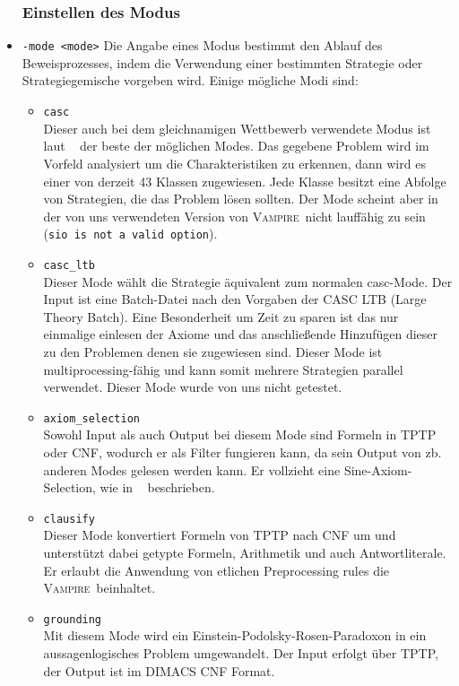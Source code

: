 \documentclass{article}
\newcommand{\vampire}{\textsc{Vampire}~}
\begin{document}
\begin{itemize}
	\subsubsection{Einstellen des Modus}

\item \verb|-mode <mode>| \label{arg:modes}
Die Angabe eines Modus bestimmt den Ablauf des Beweisprozesses, 
indem die Verwendung einer bestimmten Strategie oder Strategiegemische vorgeben wird.
Einige mögliche Modi sind:
\begin{itemize}
	\item \verb|casc| \\
	Dieser auch bei dem gleichnamigen Wettbewerb verwendete Modus ist laut ~\cite{hoder2011slides} der beste der möglichen Modes.
	Das gegebene Problem wird im Vorfeld analysiert um die Charakteristiken zu erkennen, dann wird es einer von derzeit 43 Klassen zugewiesen. Jede Klasse besitzt eine Abfolge von Strategien, die das Problem lösen sollten.
	Der Mode scheint aber in der von uns verwendeten Version von \vampire nicht lauffähig zu sein (\texttt{sio is not a valid option}).
	\item \verb|casc_ltb| \\
	Dieser Mode wählt die Strategie äquivalent zum normalen casc-Mode. Der Input ist eine Batch-Datei nach den Vorgaben der CASC LTB (Large Theory Batch). Eine Besonderheit um Zeit zu sparen ist das nur einmalige einlesen der Axiome und das anschließende Hinzufügen dieser zu den Problemen denen sie zugewiesen sind. Dieser Mode ist multiprocessing-fähig und kann somit mehrere Strategien parallel verwendet. Dieser Mode wurde von uns nicht getestet.
	\item \verb|axiom_selection| \\
	Sowohl Input als auch Output bei diesem Mode sind Formeln in TPTP oder CNF, wodurch er als Filter fungieren kann, da sein Output von zb. anderen Modes gelesen werden kann.
	Er vollzieht eine Sine-Axiom-Selection, wie in ~\cite{sinquanon} beschrieben.
	\item \verb|clausify| \\
	Dieser Mode konvertiert Formeln von TPTP nach CNF um und unterstützt dabei getypte Formeln, Arithmetik und auch Antwortliterale. Er erlaubt die Anwendung von etlichen Preprocessing rules die \vampire beinhaltet.
	\item \verb|grounding| \\
	Mit diesem Mode wird ein Einstein-Podolsky-Rosen-Paradoxon in ein aussagenlogisches Problem umgewandelt. Der Input erfolgt über TPTP, der Output ist im DIMACS CNF Format.

\end{itemize}
\end{itemize}
\end{document}
